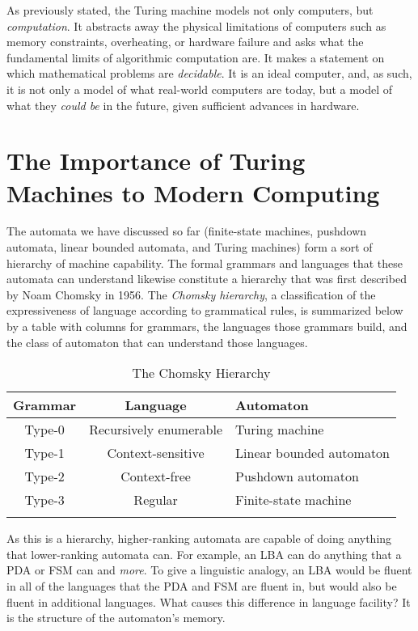 As previously stated, the Turing machine models not only computers, but \textit{computation}. It abstracts away the physical limitations of computers such as memory constraints, overheating, or hardware failure and asks what the fundamental limits of algorithmic computation are. It makes a statement on which mathematical problems are \textit{decidable}. It is an ideal computer, and, as such, it is not only a model of what real-world computers are today, but a model of what they \textit{could be} in the future, given sufficient advances in hardware. \\

\section{The Importance of Turing Machines to Modern Computing}

The automata we have discussed so far (finite-state machines, pushdown automata, linear bounded automata, and Turing machines) form a sort of hierarchy of machine capability. The formal grammars and languages that these automata can understand likewise constitute a hierarchy that was first described by Noam Chomsky in 1956. The \textit{Chomsky hierarchy}, a classification of the expressiveness of language according to grammatical rules, is summarized below by a table with columns for grammars, the languages those grammars build, and the class of automaton that can understand those languages.

\begin{table}[H]
    \caption{The Chomsky Hierarchy}
    \label{tab:LABEL}
    \begin{tabularx}{\textwidth}{|c|c|Y|}
        \hline
        Grammar & Language & Automaton \\
        \hline
        Type-0 & Recursively enumerable & Turing machine \\
        Type-1 & Context-sensitive & Linear bounded automaton \\
        Type-2 & Context-free & Pushdown automaton \\
        Type-3 & Regular & Finite-state machine \\
        \hline
    \end{tabularx}
\end{table}

As this is a hierarchy, higher-ranking automata are capable of doing anything that lower-ranking automata can. For example, an LBA can do anything that a PDA or FSM can and \textit{more}. To give a linguistic analogy, an LBA would be fluent in all of the languages that the PDA and FSM are fluent in, but would also be fluent in additional languages. What causes this difference in language facility? It is the structure of the automaton's memory. \\

